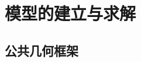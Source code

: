 \documentclass[12pt,a4paper]{article}
\newcommand{\tip}[1]{\par\noindent\textbf{【提示】} #1\par}
\begin{document}

\section{模型的建立与求解}





\subsection{公共几何框架}
\end{document}
